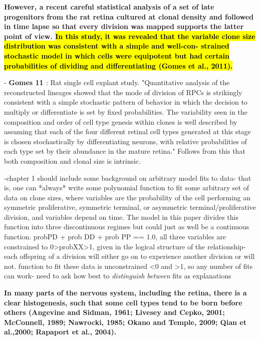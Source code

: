 \bigskip

 \textbf{However, a recent careful statistical analysis of a set of late progenitors
from the rat retina cultured at clonal density and followed in
time lapse so that every division was mapped supports the latter
point of view. \hl{In this study, it was revealed that the variable clone
size distribution was consistent with a simple and well-con-
strained stochastic model in which cells were equipotent but
had certain probabilities of dividing and differentiating (Gomes
et al., 2011).}}

\bigskip

- \textbf{Gomes 11 \cite{Gomes2011}}: Rat single cell explant study. "Quantitative analysis of the reconstructed lineages showed that the mode of division of RPCs is strikingly consistent with a simple stochastic pattern of behavior in which the decision to multiply or differentiate is set by fixed probabilities. The variability seen in the composition and order of cell type genesis within clones is well described by assuming that each of the four different retinal cell types generated at this stage is chosen stochastically by differentiating neurons, with relative probabilities of each type set by
their abundance in the mature retina." Follows from this that both composition and clonal size is intrinsic.

-chapter 1 should include some background on arbitrary model fits to data- that is, one can *always* write some polynomial function to fit some arbitrary set of data on clone sizes, where variables are the probability of the cell performing an symmetric proliferative, symmetric terminal, or asymmetric terminal/proliferative division, and variables depend on time. The model in this paper divides this function into three discontinuous regimes but could just as well be a continuous function. probPD + prob DD + prob PP == 1.0, all three variables are constrained to 0>probXX>1, given in the logical structure of the relationship- each offspring of a division will either go on to experience another division or will not. function to fit these data is unconstrained <0 and >1, so any number of fits can work- need to ask how best to \textit{distinguish between} fits as explanations

\bigskip

\textbf{
In many parts of the nervous system, including the retina, there
is a clear histogenesis, such that some cell types tend to be born
before others (Angevine and Sidman, 1961; Livesey and Cepko,
2001; McConnell, 1989; Nawrocki, 1985; Okano and Temple,
2009; Qian et al.,2000; Rapaport et al., 2004).}

